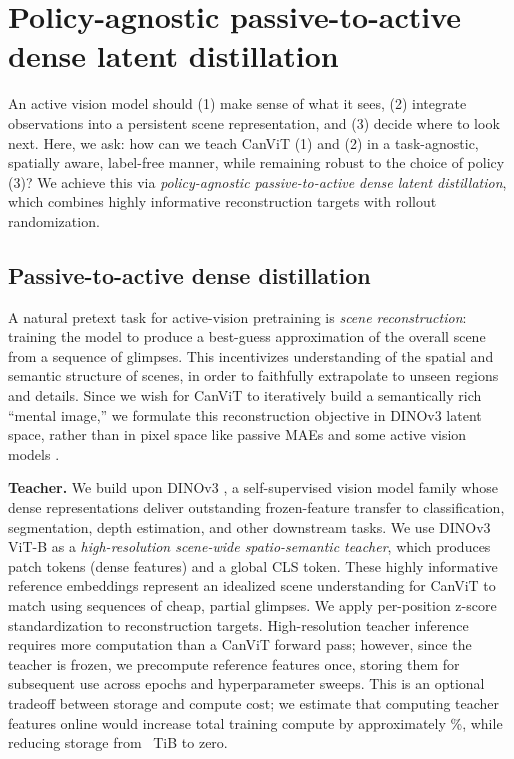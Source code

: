 \documentclass{article}
\begin{document}
\section{Policy-agnostic passive-to-active dense latent distillation}
\label{sec:pretraining}

An active vision model should (1) make sense of what it sees,
(2) integrate observations into a persistent scene representation,
and (3) decide where to look next.
Here, we ask: how can we teach CanViT (1) and (2)
in a task-agnostic, spatially aware, label-free manner,
while remaining robust to the choice of policy (3)?
We achieve this via
\emph{policy-agnostic passive-to-active dense latent distillation},
which combines highly informative reconstruction targets with rollout randomization.

\subsection{Passive-to-active dense distillation}
\label{subsec:distillation}

A natural pretext task for active-vision pretraining is \emph{scene reconstruction}:
training the model to produce a best-guess approximation of the overall scene from a sequence of glimpses.
This incentivizes understanding of the spatial and semantic structure of scenes,
in order to faithfully extrapolate to unseen regions and details.
Since we wish for CanViT to iteratively build a semantically rich ``mental image,''
we formulate this reconstruction objective in DINOv3 \cite{simeoniDINOv32026} latent space,
rather than in pixel space like passive \acp{MAE} \cite{heMaskedAutoencodersAre2022}
and some active vision models \cite{pardylAdaGlimpseActiveVisual2025}.

\textbf{Teacher.}
We build upon DINOv3 \cite{simeoniDINOv32026},
a self-supervised vision model family
whose dense representations deliver outstanding frozen-feature transfer
to classification, segmentation, depth estimation, and other downstream tasks.
We use DINOv3 ViT-B as a \emph{high-resolution scene-wide spatio-semantic teacher},
which produces patch tokens (dense features) and a global CLS token.
These highly informative reference embeddings represent an idealized scene understanding
for CanViT to match using sequences of cheap, partial glimpses.
We apply per-position z-score standardization to reconstruction targets.
High-resolution teacher inference requires more computation than a CanViT forward pass;
however, since the teacher is frozen,
we precompute reference features once,
storing them for subsequent use across epochs and hyperparameter sweeps.
This is an optional tradeoff between storage and compute cost; we estimate that computing teacher features online would increase total training compute by approximately \onlineTeacherIncreasePct\%, while reducing storage from \teacherFeaturesTiB{}~TiB to zero.
\end{document}
